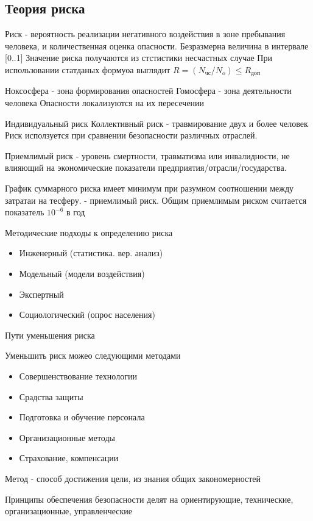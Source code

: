 \documentclass[a4paper,12pt]{report}
\begin{document}
	\subsection{Теория риска}
	Риск - вероятность реализации негативного воздействия в зоне пребывания человека, и количественная оценка опасности. Безразмерна величина в интервале [0..1]
	Значение риска получаются из стстистики несчастных случае
	При использовании статданых формуоа выглядит $R = (N_{\mbox{чс}}/N_o) \le R_{\mbox{доп}}$
	
	Ноксосфера - зона формирования опасностей 
	Гомосфера - зона деятельности человека
	Опасности локализуются на их пересечении
	
	Индивидуальный риск
	Коллективный риск - травмирование двух и более человек
	Риск исползуется при сравнении безопасности различных отраслей.
	
	Приемлимый риск - уровень смертности, травматизма или инвалидности, не влияющий на экономические показатели предприятия/отрасли/государства.
	
	
	График суммарного риска имеет минимум при разумном соотношении между затратаи на тесферу. - приемлимый риск.
	Общим приемлимым риском считается показатель $10^{-6}$ в год
	
	
	
	Методические подходы к определению риска
	\begin{itemize}
	\item	Инженерный (статистика. вер. анализ)
	\item	Модельный (модели воздействия)
	\item	Экспертный
	\item	Социологический (опрос населения)
	\end{itemize}
	
	Пути уменьшения риска
	
	Уменьшить риск можео следующими методами
	\begin{itemize}
	\item	Совершенствование технологии
	\item	Срадства защиты
	\item	Подготовка и обучение персонала
	\item Организационные методы
	\item	Страхование, компенсации
	\end{itemize}
	
	Метод -  способ достижения цели, из знания общих закономерностей
	
	Принципы обеспечения безопасности делят на ориентирующие, технические, организационные, управленческие
	
\end{document}
